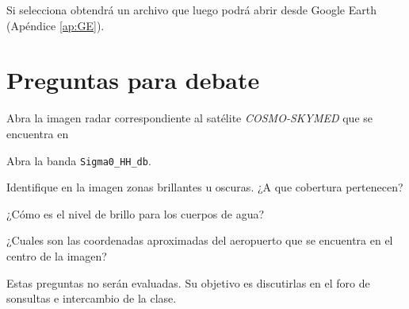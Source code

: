 Si selecciona  obtendrá un archivo  que luego podrá abrir desde Google Earth (Apéndice \ref{ap:GE}).

\section{Preguntas para debate}

Abra la imagen radar correspondiente al satélite \emph{COSMO-SKYMED} que se encuentra en
\begin{center}
\end{center}
Abra la banda \texttt{Sigma0\_HH\_db}.

\begin{que}
    Identifique en la imagen zonas brillantes u oscuras. ¿A que cobertura pertenecen?
\end{que}

\begin{que}
    ¿Cómo es el nivel de brillo para los cuerpos de agua?
\end{que}

\begin{que}
    ¿Cuales son las coordenadas aproximadas del aeropuerto que se encuentra en el centro de la imagen?
\end{que}

Estas preguntas no serán evaluadas. Su objetivo es discutirlas en el foro de sonsultas e intercambio de la clase.
